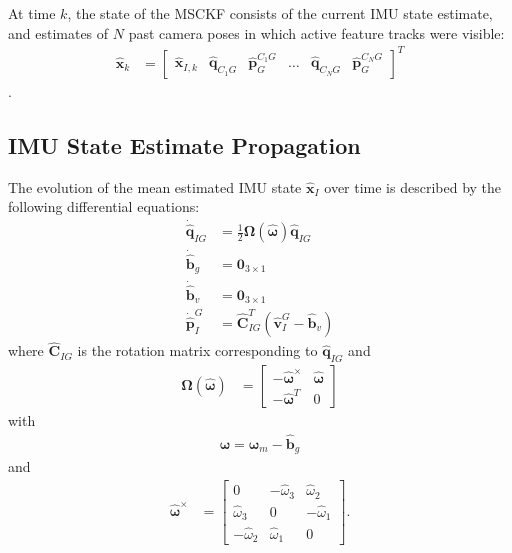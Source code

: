 \documentclass[letterpaper, 10 pt, conference]{ieeeconf}  %
\def\Vec#1{\mathbf{#1}}
\newcommand{\bbm}{\begin{bmatrix}}
\newcommand{\ebm}{\end{bmatrix}}
\begin{document}
At time $k$, the state of the MSCKF consists of the current IMU state estimate, and estimates of $N$ past camera poses in which active feature tracks were visible:
\begin{align}
    \hat{\Vec{x}}_k &= \bbm \hat{\Vec{x}}_{I,k} & \hat{\Vec{q}}_{C_1 G} & \hat{\Vec{p}}_G^{C_1 G} & \hdots & \hat{\Vec{q}}_{C_N G} & \hat{\Vec{p}}_G^{C_N G} \ebm ^T
\end{align}.

\subsection{IMU State Estimate Propagation}
The evolution of the mean estimated IMU state $\hat{\Vec{x}}_I$ over time is described by the following differential equations:
\begin{align}
    \dot{\hat{\Vec{q}}}_{IG} &= \frac{1}{2}\boldsymbol{\Omega}\left(\hat{\boldsymbol{\omega}}\right)\hat{\Vec{q}}_{IG} \\
    \dot{\hat{\Vec{b}}}_g  &= \Vec{0}_{3\times1} \\
    \dot{\hat{\Vec{b}}}_v &= \Vec{0}_{3\times1} \\
    \dot{\hat{\Vec{p}}}^G_I &= \hat{\Vec{C}}_{I G}^T\left(\hat{\Vec{v}}^G_I - \hat{\Vec{b}}_v \right)
\end{align}
where $\hat{\Vec{C}}_{I G}$ is the rotation matrix corresponding to $\hat{\Vec{q}}_{IG}$ and
\begin{align*}
    \boldsymbol{\Omega}\left(\hat{\boldsymbol{\omega}}\right) &= \bbm -\hat{\boldsymbol{\omega}}^\times & \hat{\boldsymbol{\omega}} \\
                                                                -\hat{\boldsymbol{\omega}}^T & 0
                                                            \ebm 
\end{align*}
with
\begin{align*}
    \hat{\boldsymbol{\omega}} = \boldsymbol{\omega}_m - \hat{\Vec{b}}_g
\end{align*}
and
\begin{align*}
    \hat{\boldsymbol{\omega}}^\times &=   \bbm    0 & -\hat{\omega}_3 & \hat{\omega}_2 \\
                                                \hat{\omega}_3 & 0 & -\hat{\omega}_1 \\
                                                -\hat{\omega}_2 & \hat{\omega}_1 & 0
                                            \ebm .
\end{align*}
\end{document}
